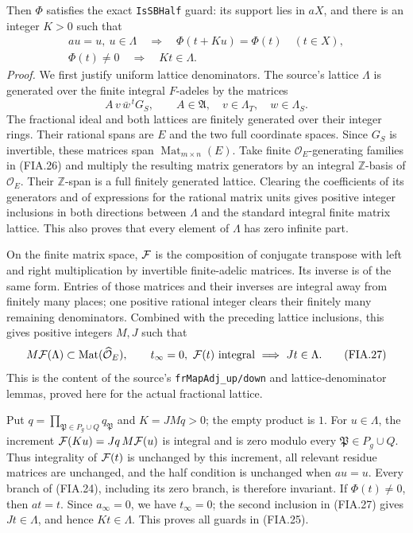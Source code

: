 Then \(\Phi\) satisfies the exact \texttt{IsSBHalf} guard:
its support lies in \(aX\), and there is an integer \(K>0\)
such that
\[
 \begin{gathered}
 au=u,\ u\in\Lambda
       \quad\Longrightarrow\quad
       \Phi(t+Ku)=\Phi(t)\quad(t\in X),\\
 \Phi(t)\ne0\quad\Longrightarrow\quad Kt\in\Lambda .
 \end{gathered}                                                     \tag{FIA.25}
\]
\emph{Proof.}
We first justify uniform lattice denominators.
The source's lattice \(\Lambda\) is generated over the finite
integral \(F\)-adeles by the matrices
\[
           A\,v\,\bar w^{\,t}G_S,\qquad
 A\in\mathfrak A,\quad v\in\Lambda_T,\quad w\in\Lambda_S.
 \tag{FIA.26}
\]
The fractional ideal and both lattices are finitely generated
over their integer rings.  Their rational spans are \(E\)
and the two full coordinate spaces.  Since \(G_S\) is invertible,
these matrices span \(\operatorname{Mat}_{m\times n}(E)\).
Take finite \(\mathcal O_E\)-generating families in (FIA.26)
and multiply the resulting matrix generators by an integral
\(\mathbb Z\)-basis of \(\mathcal O_E\).
Their \(\mathbb Z\)-span is a full finitely generated
lattice.  Clearing the coefficients of its generators and of
expressions for the rational matrix units gives positive integer
inclusions in both directions between \(\Lambda\) and the
standard integral finite matrix lattice.
This also proves that every element of \(\Lambda\) has zero
infinite part.

On the finite matrix space, \({\cal F}\) is the composition of
conjugate transpose with left and right multiplication by
invertible finite-adelic matrices.  Its inverse is of the same
form.  Entries of those matrices and their inverses are integral
away from finitely many places; one positive rational integer
clears their finitely many remaining denominators.
Combined with the preceding lattice inclusions, this gives
positive integers \(M,J\) such that
\[
 M{\cal F}(\Lambda)\subset
                   \operatorname{Mat}(\widehat{\mathcal O}_E),
 \qquad
 t_\infty=0,\ {\cal F}(t)\text{ integral}
                       \ \Longrightarrow\ Jt\in\Lambda .
 \tag{FIA.27}
\]
This is the content of the source's
\texttt{frMapAdj\_up/down} and lattice-denominator lemmas,
proved here for the actual fractional lattice.

Put \(q=\prod_{\mathfrak P\in P_g\cup Q}q_{\mathfrak P}\)
and \(K=JMq>0\); the empty product is \(1\).
For \(u\in\Lambda\), the increment
\({\cal F}(Ku)=Jq\,M{\cal F}(u)\) is integral and is zero
modulo every \(\mathfrak P\in P_g\cup Q\).
Thus integrality of \({\cal F}(t)\) is unchanged by this
increment, all relevant residue matrices are unchanged,
and the half condition is unchanged when \(au=u\).
Every branch of (FIA.24), including its zero branch,
is therefore invariant.  If \(\Phi(t)\ne0\), then \(at=t\).
Since \(a_\infty=0\), we have \(t_\infty=0\); the second
inclusion in (FIA.27) gives \(Jt\in\Lambda\), and hence
\(Kt\in\Lambda\).  This proves all guards in (FIA.25).

